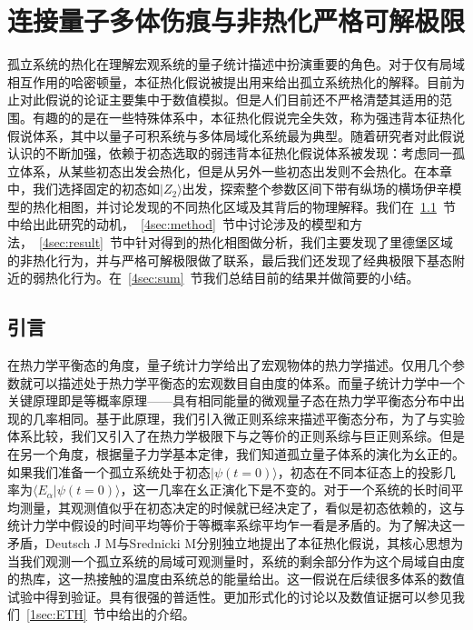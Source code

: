 \chapter{连接量子多体伤痕与非热化严格可解极限}\label{chap:ETH}

孤立系统的热化在理解宏观系统的量子统计描述中扮演重要的角色。对于仅有局域相互作用的哈密顿量，本征热化假说被提出用来给出孤立系统热化的解释。目前为止对此假说的论证主要集中于数值模拟。但是人们目前还不严格清楚其适用的范围。有趣的的是在一些特殊体系中，本征热化假说完全失效，称为强违背本征热化假说体系，其中以量子可积系统与多体局域化系统最为典型。随着研究者对此假说认识的不断加强，依赖于初态选取的弱违背本征热化假说体系被发现：考虑同一孤立体系，从某些初态出发会热化，但是从另外一些初态出发则不会热化。在本章中，我们选择固定的初态如$|Z_2\rangle$出发，探索整个参数区间下带有纵场的横场伊辛模型的热化相图，并讨论发现的不同热化区域及其背后的物理解释。我们在~\ref{4sec:intro}~节中给出此研究的动机，~\ref{4sec:method}~节中讨论涉及的模型和方法，~\ref{4sec:result}~节中针对得到的热化相图做分析，我们主要发现了里德堡区域的非热化行为，并与严格可解极限做了联系，最后我们还发现了经典极限下基态附近的弱热化行为。在~\ref{4sec:sum}~节我们总结目前的结果并做简要的小结。

\section{引言}\label{4sec:intro}
在热力学平衡态的角度，量子统计力学给出了宏观物体的热力学描述。仅用几个参数就可以描述处于热力学平衡态的宏观数目自由度的体系。而量子统计力学中一个关键原理即是等概率原理——具有相同能量的微观量子态在热力学平衡态分布中出现的几率相同。基于此原理，我们引入微正则系综来描述平衡态分布，为了与实验体系比较，我们又引入了在热力学极限下与之等价的正则系综与巨正则系综。但是在另一个角度，根据量子力学基本定律，我们知道孤立量子体系的演化为幺正的。如果我们准备一个孤立系统处于初态$|\psi(t=0)\rangle$，初态在不同本征态上的投影几率为$\langle E_\alpha|\psi(t=0)\rangle$，这一几率在幺正演化下是不变的。对于一个系统的长时间平均测量，其观测值似乎在初态决定的时候就已经决定了，看似是初态依赖的，这与统计力学中假设的时间平均等价于等概率系综平均乍一看是矛盾的。为了解决这一矛盾，Deutsch J M\cite{Deutsch1991quantum}与Srednicki M\cite{Srednicki1994chaos}分别独立地提出了本征热化假说，其核心思想为当我们观测一个孤立系统的局域可观测量时，系统的剩余部分作为这个局域自由度的热库，这一热接触的温度由系统总的能量给出。这一假说在后续很多体系的数值试验中得到验证。具有很强的普适性。更加形式化的讨论以及数值证据可以参见我们~\ref{1sec:ETH}~节中给出的介绍。

